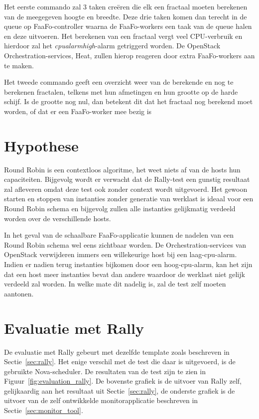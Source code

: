 Het eerste commando zal 3 taken creëren die elk een fractaal moeten berekenen van de meegegeven hoogte en breedte. Deze drie taken komen dan terecht in de queue op FaaFo-controller waarna de FaaFo-workers een taak van de queue halen en deze uitvoeren. Het berekenen van een fractaal vergt veel CPU-verbruik en hierdoor zal het \textit{cpu\textunderscore alarm\textunderscore high}-alarm getriggerd worden. De OpenStack Orchestration-services, Heat, zullen hierop reageren door extra FaaFo-workers aan te maken.

Het tweede commando geeft een overzicht weer van de berekende en nog te berekenen fractalen, telkens met hun afmetingen en hun grootte op de harde schijf. Is de grootte nog nul, dan betekent dit dat het fractaal nog berekend moet worden, of dat er een FaaFo-worker mee bezig is

\section{Hypothese}

Round Robin is een contextloos algoritme, het weet niets af van de hosts hun capaciteiten. Bijgevolg wordt er verwacht dat de Rally-test een gunstig resultaat zal afleveren omdat deze test ook zonder context wordt uitgevoerd. Het gewoon starten en stoppen van instanties zonder generatie van werklast is ideaal voor een Round Robin schema en bijgevolg zullen alle instanties gelijkmatig verdeeld worden over de verschillende hosts.

In het geval van de schaalbare FaaFo-applicatie kunnen de nadelen van een Round Robin schema wel eens zichtbaar worden. De Orchestration-services van OpenStack verwijderen immers een willekeurige host bij een laag-cpu-alarm. Indien er nadien terug instanties bijkomen door een hoog-cpu-alarm, kan het zijn dat een host meer instanties bevat dan andere waardoor de werklast niet gelijk verdeeld zal worden.  In welke mate dit nadelig is, zal de test zelf moeten aantonen.

\section{Evaluatie met Rally}

De evaluatie met Rally gebeurt met dezelfde template zoals beschreven in Sectie~\ref{sec:rally}. Het enige verschil met de test die daar is uitgevoerd, is de gebruikte Nova-scheduler. De resultaten van de test zijn te zien in Figuur~\ref{fig:evaluation_rally}. De bovenste grafiek is de uitvoer van Rally zelf, gelijkaardig aan het resultaat uit Sectie~\ref{sec:rally}, de onderste grafiek is de uitvoer van de zelf ontwikkelde monitorapplicatie beschreven in Sectie~\ref{sec:monitor_tool}.

